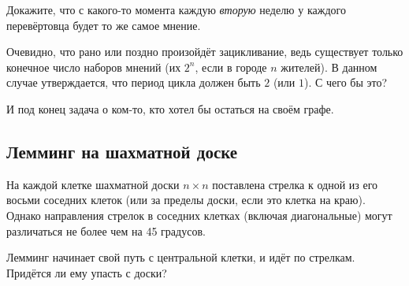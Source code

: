 Докажите, что с какого-то момента каждую \emph{вторую} неделю у каждого перевёртовца будет то же самое мнение.

Очевидно, что рано или поздно произойдёт зацикливание, ведь существует только конечное число наборов мнений (их $2^n$, если в городе $n$ жителей). 
В данном случае утверждается, что период цикла должен быть $2$ (или $1$).
С чего бы это?

\medskip

И под конец задача о ком-то, кто хотел бы остаться на своём графе.

\subsection*{Лемминг на шахматной доске}\label{Лемминг на шахматной доске}

На каждой клетке шахматной доски $n\times n$ поставлена стрелка к одной из его восьми соседних клеток (или за пределы доски, если это клетка на краю).
Однако направления стрелок в соседних клетках (включая диагональные) могут различаться не более чем на 45 градусов.

Лемминг начинает свой путь с центральной клетки, и идёт по стрелкам.
Придётся ли ему упасть с доски?

